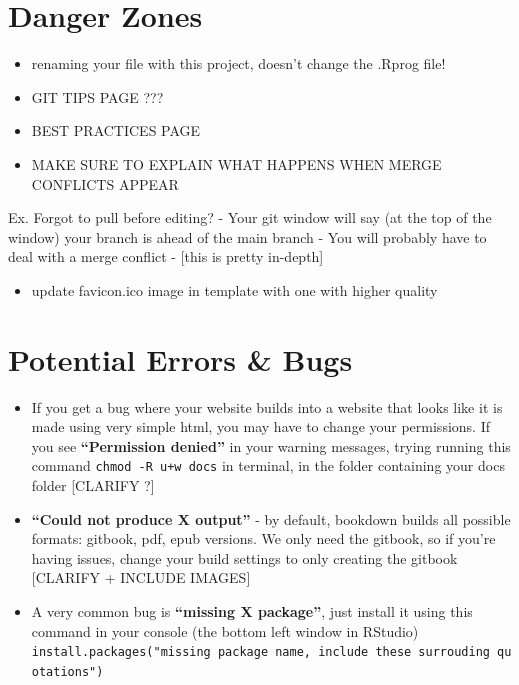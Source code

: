 \documentclass[
]{book}
\providecommand{\tightlist}{%
  \setlength{\itemsep}{0pt}\setlength{\parskip}{0pt}}
\theoremstyle{definition}
\theoremstyle{definition}
\theoremstyle{definition}
\theoremstyle{definition}
\theoremstyle{remark}
\begin{document}
\section{Danger Zones}\label{danger-zones}

\begin{itemize}
\item
  renaming your file with this project, doesn't change the .Rprog file!
\item
  GIT TIPS PAGE ???
\item
  BEST PRACTICES PAGE
\item
  MAKE SURE TO EXPLAIN WHAT HAPPENS WHEN MERGE CONFLICTS APPEAR
\end{itemize}

Ex. Forgot to pull before editing?
- Your git window will say (at the top of the window) your branch is ahead of the main branch
- You will probably have to deal with a merge conflict
- {[}this is pretty in-depth{]}

\begin{itemize}
\tightlist
\item
  update favicon.ico image in template with one with higher quality
\end{itemize}

\section{Potential Errors \& Bugs}\label{potential-errors-bugs}

\begin{itemize}
\item
  If you get a bug where your website builds into a website that looks like it is made using very simple html, you may have to change your permissions. If you see \textbf{``Permission denied''} in your warning messages, trying running this command \texttt{chmod\ -R\ u+w\ docs} in terminal, in the folder containing your docs folder {[}CLARIFY ?{]}
\item
  \textbf{``Could not produce X output''} - by default, bookdown builds all possible formats: gitbook, pdf, epub versions. We only need the gitbook, so if you're having issues, change your build settings to only creating the gitbook {[}CLARIFY + INCLUDE IMAGES{]}
\item
  A very common bug is \textbf{``missing X package''}, just install it using this command in your console (the bottom left window in RStudio) \texttt{install.packages("missing\ package\ name,\ include\ these\ surrouding\ quotations")}
\end{itemize}
\end{document}
